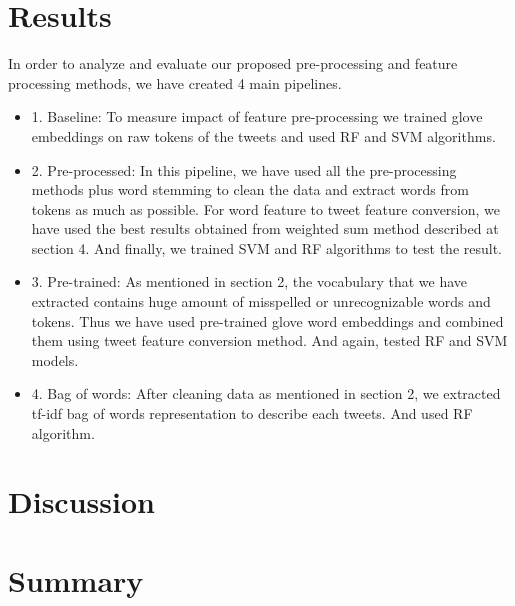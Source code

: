 \documentclass[10pt,conference,compsocconf]{IEEEtran}
\begin{document}
\section{Results}
\label{S4}
In order to analyze and evaluate our proposed pre-processing and feature processing methods, we have created 4 main pipelines.
\begin{itemize}
	\item 1. Baseline: 
	To measure impact of feature pre-processing we trained glove embeddings on raw tokens of the tweets and used RF and SVM algorithms.
	\item 2. Pre-processed:
	In this pipeline, we have used all the pre-processing methods plus word stemming to clean the data and extract words from tokens as much as possible. For word feature to tweet feature conversion, we have used the best results obtained from weighted sum method described at section 4. And finally, we trained SVM and RF algorithms to test the result.
	\item 3. Pre-trained:
	As mentioned in section 2, the vocabulary that we have extracted contains huge amount of misspelled or unrecognizable words and tokens. Thus we have used pre-trained glove word embeddings and combined them using tweet feature conversion method. And again, tested RF and SVM models.
	\item 4. Bag of words:
	After cleaning data as mentioned in section 2, we extracted tf-idf bag of words representation to describe each tweets. And used RF algorithm.
\end{itemize}


\section{Discussion}
\label{S5}

\section{Summary}
\label{S6}



\end{document}
